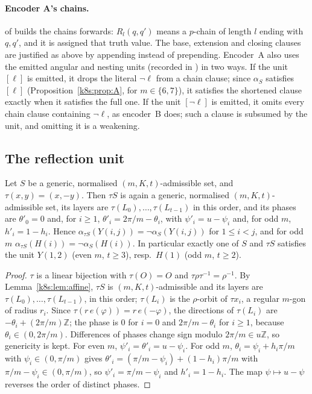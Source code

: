 \paragraph{Encoder A's chains.}  of  builds the chains forwards:
$R_l(q,q')$ means a $p$-chain of length $l$ ending with $q,q'$, and it is assigned that truth value. The base,
extension and closing clauses are justified as above by appending instead of prepending. Encoder~A also uses the
emitted angular and nesting units (recorded in ) in two ways. If the unit $[\ell]$ is emitted, it drops the
literal $\neg\ell$ from a chain clause; since $\alpha_S$ satisfies $[\ell]$ (Proposition~\ref{k8s:prop:A}, for
$m\in\{6,7\}$), it
satisfies the shortened clause exactly when it satisfies the full one. If the unit $[\neg\ell]$ is emitted, it omits
every chain clause containing $\neg\ell$, as encoder~B does; such a clause is subsumed by the unit, and omitting it is
a weakening.

\subsection{The reflection unit}\label{k8s:sec:reflection}

\begin{lemma}\label{k8s:lem:refl}
Let $S$ be a generic, normalised $(m,K,t)$-admissible set, and $\tau(x,y)=(x,-y)$. Then $\tau S$ is again a generic,
normalised $(m,K,t)$-admissible set, its layers are $\tau(L_0),\dots,\tau(L_{t-1})$ in this order, and its phases are
$\theta'_0=0$ and, for $i\ge1$, $\theta'_i=2\pi/m-\theta_i$, with $\psi'_i=u-\psi_i$ and, for odd $m$, $h'_i=1-h_i$. Hence $\alpha_{\tau S}(Y(i,j))=\neg\alpha_S(Y(i,j))$ for $1\le i<j$, and for odd $m$
$\alpha_{\tau S}(H(i))=\neg\alpha_S(H(i))$. In particular exactly one of $S$ and $\tau S$ satisfies the unit $Y(1,2)$
(even $m$, $t\ge3$), resp.\ $H(1)$ (odd $m$, $t\ge2$).
\end{lemma}

\begin{proof}
$\tau$ is a linear bijection with $\tau(O)=O$ and $\tau\rho\tau^{-1}=\rho^{-1}$. By Lemma~\ref{k8s:lem:affine}, $\tau S$ is
$(m,K,t)$-admissible and its layers are $\tau(L_0),\dots,\tau(L_{t-1})$, in this order; $\tau(L_i)$ is the $\rho$-orbit of
$\tau x_i$, a regular $m$-gon of radius $r_i$. Since $\tau(r\,e(\varphi))=r\,e(-\varphi)$, the directions of
$\tau(L_i)$ are $-\theta_i+(2\pi/m)\mathbb Z$; the phase is $0$ for $i=0$ and $2\pi/m-\theta_i$ for $i\ge1$, because
$\theta_i\in(0,2\pi/m)$. Differences of phases change sign modulo $2\pi/m\in u\mathbb Z$, so genericity is kept. For
even $m$, $\psi'_i=\theta'_i=u-\psi_i$. For odd $m$, $\theta_i=\psi_i+h_i\pi/m$ with $\psi_i\in(0,\pi/m)$ gives
$\theta'_i=(\pi/m-\psi_i)+(1-h_i)\pi/m$ with $\pi/m-\psi_i\in(0,\pi/m)$, so $\psi'_i=\pi/m-\psi_i$ and $h'_i=1-h_i$. The map
$\psi\mapsto u-\psi$ reverses the order of distinct phases.
\end{proof}


